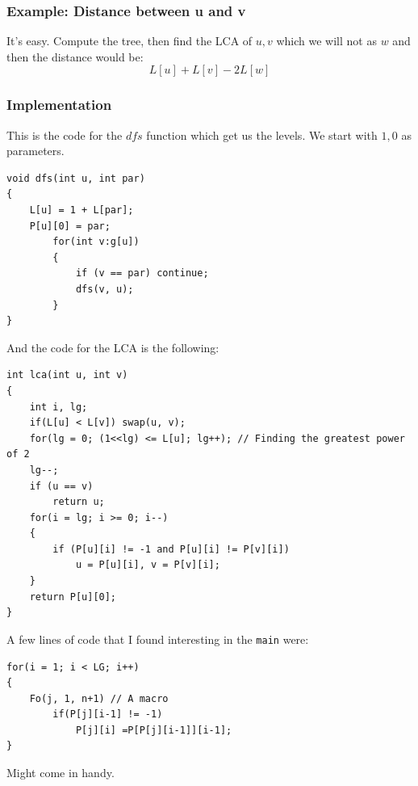 \documentclass{IEEEtran}
\begin{document}
            \subsubsection{Example: Distance between u and v} 
                It's easy. Compute the tree, then find the LCA of $u,v$ which we will not as $w$ and then the distance would be:
                $$L[u]+L[v]-2L[w]$$
            \subsubsection{Implementation}
                This is the code for the $dfs$ function which get us the levels. We start with $1,0$ as parameters.
                \begin{lstlisting}
void dfs(int u, int par)
{
    L[u] = 1 + L[par];
    P[u][0] = par;
        for(int v:g[u])
        {
            if (v == par) continue;
            dfs(v, u);
        }
}
                \end{lstlisting}
                And the code for the LCA is the following:
                \begin{lstlisting}
int lca(int u, int v)
{
    int i, lg;
    if(L[u] < L[v]) swap(u, v);
    for(lg = 0; (1<<lg) <= L[u]; lg++); // Finding the greatest power of 2
    lg--;
    if (u == v)
        return u;
    for(i = lg; i >= 0; i--)
    {
        if (P[u][i] != -1 and P[u][i] != P[v][i])
            u = P[u][i], v = P[v][i];
    }
    return P[u][0];
}
                \end{lstlisting}
                A few lines of code that I found interesting in the \texttt{main} were:
                \begin{lstlisting}
for(i = 1; i < LG; i++)
{
    Fo(j, 1, n+1) // A macro
        if(P[j][i-1] != -1)
            P[j][i] =P[P[j][i-1]][i-1];
}
                \end{lstlisting}
                Might come in handy.
\end{document}
